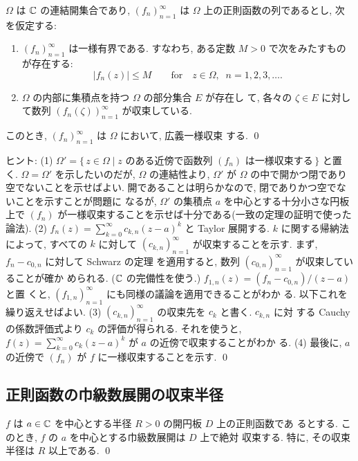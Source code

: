 \documentclass[12pt,twoside]{jarticle}
\begin{document}
\begin{question}
  $\Omega$ は ${\mathbb C}$ の連結開集合であり, $(f_n)_{n=1}^{\infty}$ は 
  $\Omega$ 上の正則函数の列であるとし, 次を仮定する:
  \begin{enumerate}
  \item $(f_n)_{n=1}^{\infty}$ は一様有界である. すなわち, ある定数 
    $M > 0$ で次をみたすものが存在する:
    \[
      |f_n(z)| \le M
      \qquad\text{for}\quad
      z\in\Omega,\;\; n=1,2,3,\dots.
    \]%
  \item $\Omega$ の内部に集積点を持つ $\Omega$ の部分集合 $E$ が存在し
    て, 各々の $\zeta\in E$ に対して数列 $(f_n(\zeta))_{n=1}^{\infty}$ 
    が収束している.
  \end{enumerate}
  このとき, $(f_n)_{n=1}^{\infty}$ は $\Omega$ において, 広義一様収束
  する. 
  \qed
\end{question}

\noindent ヒント: (1) %
\(
  \Omega'=
  \{\, z \in \Omega \mid 
       \text{$z$ のある近傍で函数列 $(f_n)$ は一様収束する}\,\}
\)%
と置く. $\Omega = \Omega'$ を示したいのだが, $\Omega$ の連結性より,
$\Omega'$ が $\Omega$ の中で開かつ閉であり空でないことを示せばよい.
開であることは明らかなので, 閉でありかつ空でないことを示すことが問題に
なるが, $\Omega'$ の集積点 $a$ を中心とする十分小さな円板上で $(f_n)$ 
が一様収束することを示せば十分である(一致の定理の証明で使った論法). %
(2) $f_n(z)=\sum_{k=0}^{\infty}c_{k,n}(z-a)^k$ と Taylor 展開する. $k$ 
に関する帰納法によって, すべての $k$ に対して $(c_{k,n})_{n=1}^{\infty}$ 
が収束することを示す. まず, $f_n - c_{0,n}$ に対して Schwarz の定理
を適用すると, 数列 $(c_{0,n})_{n=1}^{\infty}$ が収束していることが確か
められる. (${\mathbb C}$ の完備性を使う.) $f_{1,n}(z)=(f_n-c_{0,n})/(z-a)$ と置
くと, $(f_{1,n})_{n=1}^{\infty}$ にも同様の議論を適用できることがわか
る. 以下これを繰り返えせばよい. %
(3) $(c_{k,n})_{n=1}^{\infty}$ の収束先を $c_k$ と書く. $c_{k,n}$ に対
する Cauchy の係数評価式より $c_k$ の評価が得られる. それを使うと, 
$f(z)=\sum_{k=0}^{\infty}c_k(z-a)^k$ が $a$ の近傍で収束することがわか
る. %
(4) 最後に, $a$ の近傍で $(f_n)$ が $f$ に一様収束することを示す.
\qed


\subsection{正則函数の巾級数展開の収束半径}

\begin{question}
  $f$ は $a\in{\mathbb C}$ を中心とする半径 $R>0$ の開円板 $D$ 上の正則函数であ
  るとする. このとき, $f$ の $a$ を中心とする巾級数展開は $D$ 上で絶対
  収束する. 特に, その収束半径は $R$ 以上である. \qed
\end{question}
\end{document}
